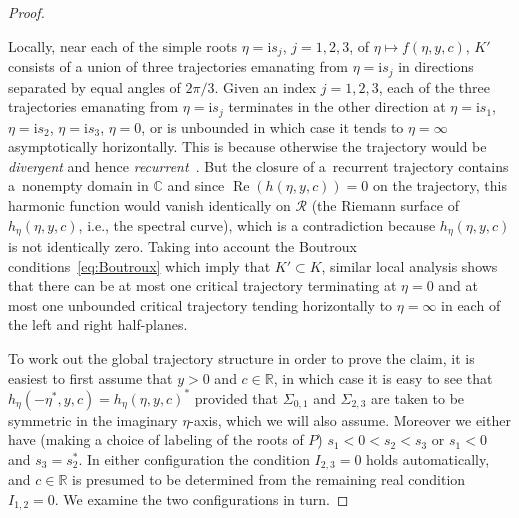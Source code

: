 \documentclass[11pt]{article}
\numberwithin{equation}{section}
\numberwithin{equation}{section}
\begin{document}
\begin{proof}
\begin{itemize}
\end{itemize}
Locally, near each of the simple roots $\eta=\mathrm{i} s_j$, $j=1,2,3$, of $\eta\mapsto f(\eta,y,c)$, $K'$ consists of a union of three trajectories emanating from $\eta=\mathrm{i} s_j$ in directions separated by equal angles of $2\pi/3$. Given an index $j=1,2,3$, each of the three trajectories emanating from $\eta=\mathrm{i} s_j$ terminates in the other direction at $\eta=\mathrm{i} s_1$, $\eta=\mathrm{i} s_2$, $\eta=\mathrm{i} s_3$, $\eta=0$, or is unbounded in which case it tends to $\eta=\infty$ asymptotically horizontally. This is because otherwise the trajectory would be \emph{divergent} and hence \emph{recurrent}~\cite[Theorem 11.1]{Strebel84}. But the closure of a~recurrent trajectory contains a~nonempty domain in $\mathbb{C}$ and since $\operatorname{Re}(h(\eta,y,c))=0$ on the trajectory, this harmonic function would vanish identically on $\mathcal{R}$ (the Riemann surface of $h_\eta(\eta,y,c)$, i.e., the spectral curve), which is a contradiction because $h_\eta(\eta,y,c)$ is not identically zero. Taking into account the Boutroux conditions~\eqref{eq:Boutroux} which imply that $K'\subset K$, similar local analysis shows that there can be at most one critical trajectory terminating at $\eta=0$ and at most one unbounded critical trajectory tending horizontally to $\eta=\infty$ in each of the left and right half-planes.

To work out the global trajectory structure in order to prove the claim, it is easiest to first assume that $y>0$ and $c\in\mathbb{R}$, in which case it is easy to see that $h_\eta(-\eta^*,y,c)=h_\eta(\eta,y,c)^*$ provided that $\Sigma_{0,1}$ and $\Sigma_{2,3}$ are taken to be symmetric in the imaginary $\eta$-axis, which we will also assume. Moreover we either have (making a choice of labeling of the roots of $P$) $s_1<0<s_2<s_3$ or $s_1<0$ and $s_3=s_2^*$. In either configuration the condition $I_{2,3}=0$ holds automatically, and $c\in\mathbb{R}$ is presumed to be determined from the remaining real condition $I_{1,2}=0$. We examine the two configurations in turn.


\end{proof}
\end{document}
